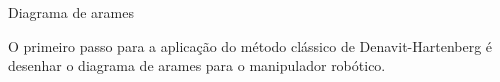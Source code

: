 \documentclass[aspectratio=169]{beamer}
\begin{document}
{
%
\begin{frame}{Diagrama de arames}
    \begin{minipage}{0.5\textwidth}
        O primeiro passo para a apli\-cação do método clássico de Denavit-Hartenberg é desenhar o diagrama de arames para o manipulador robótico.
    \end{minipage}
\end{frame}
}
\end{document}

